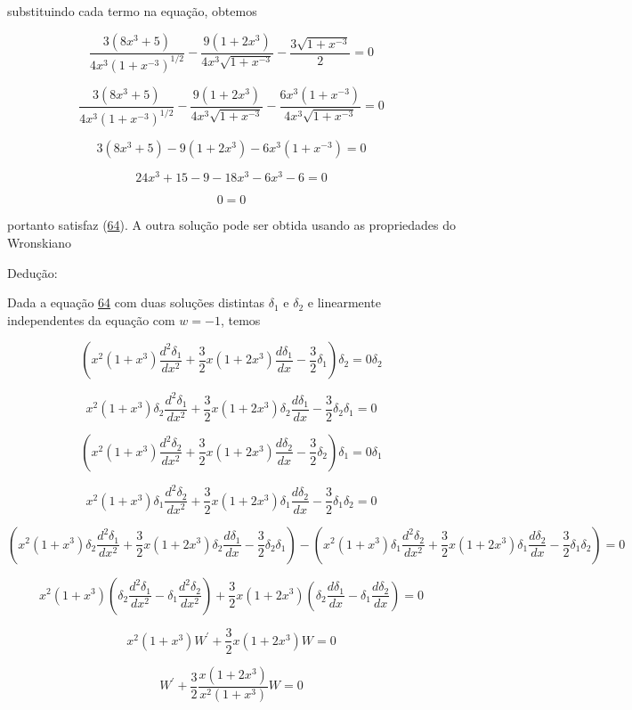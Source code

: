 \documentclass[a4paper,12pt]{article}
\begin{document}
substituindo cada termo na equação, obtemos

$$\dfrac{3 (8x^3 + 5)}{4x^3\left(1+x^{-3}\right)^{1/2} } - \dfrac{9(1+ 2x^{3})}{4x^3\sqrt{1+x^{-3}}} - \dfrac{3\sqrt{1+x^{-3}}}{2} = 0$$

$$\dfrac{3 (8x^3 + 5)}{4x^3\left(1+x^{-3}\right)^{1/2} } - \dfrac{9(1+ 2x^{3})}{4x^3\sqrt{1+x^{-3}}} - \dfrac{6x^3(1+x^{-3})}{{4x^3\sqrt{1+x^{-3}}}} = 0$$

$$3 (8x^3 + 5) - 9(1+ 2x^{3}) - 6x^3(1+x^{-3}) =0$$

$$24x^3 + 15 - 9- 18x^{3} - 6x^3 -6 =0$$

$$0 = 0$$

 portanto satisfaz (\hyperref[eq64]{64}). A outra solução pode ser obtida usando as propriedades do
Wronskiano
\newline

Dedução:

Dada a equação \hyperref[eq64]{64} com duas soluções distintas $\delta_1$ e $\delta_2$ e linearmente independentes da equação com $w = -1$, temos

$$\left(x^2 (1+x^3)\dfrac{d^2\delta_1}{dx^2} + \dfrac{3}{2}x(1+ 2x^3)\dfrac{d\delta_1}{dx} - \dfrac{3}{2}\delta_1 \right)\delta_2 = 0\delta_2$$

$$x^2 (1+x^3)\delta_2\dfrac{d^2\delta_1}{dx^2} + \dfrac{3}{2}x(1+ 2x^3)\delta_2\dfrac{d\delta_1}{dx} - \dfrac{3}{2}\delta_2\delta_1  = 0$$

$$\left( x^2 (1+x^3)\dfrac{d^2\delta_2}{dx^2} + \dfrac{3}{2}x(1+ 2x^3)\dfrac{d\delta_2}{dx} - \dfrac{3}{2}\delta_2\right)\delta_1 = 0\delta_1$$

$$ x^2 (1+x^3)\delta_1\dfrac{d^2\delta_2}{dx^2} + \dfrac{3}{2}x(1+ 2x^3)\delta_1\dfrac{d\delta_2}{dx} - \dfrac{3}{2}\delta_1\delta_2= 0$$

$\left(x^2 (1+x^3)\delta_2\dfrac{d^2\delta_1}{dx^2} + \dfrac{3}{2}x(1+ 2x^3)\delta_2\dfrac{d\delta_1}{dx} - \dfrac{3}{2}\delta_2\delta_1  \right) - \left( x^2 (1+x^3)\delta_1\dfrac{d^2\delta_2}{dx^2} + \dfrac{3}{2}x(1+ 2x^3)\delta_1\dfrac{d\delta_2}{dx} - \dfrac{3}{2}\delta_1\delta_2\right) =0$

$$x^2 (1+x^3)\left( \delta_2\dfrac{d^2\delta_1}{dx^2}-\delta_1\dfrac{d^2\delta_2}{dx^2}\right) + \dfrac{3}{2}x(1+ 2x^3)\left(\delta_2\dfrac{d\delta_1}{dx} - \delta_1\dfrac{d\delta_2}{dx}\right)  =0$$

$$x^2 (1+x^3)W^\prime + \dfrac{3}{2}x(1+ 2x^3)W  =0$$

$$W^\prime + \dfrac{3}{2}\dfrac{x(1+ 2x^3)}{x^2 (1+x^3)}W  =0$$
\end{document}
